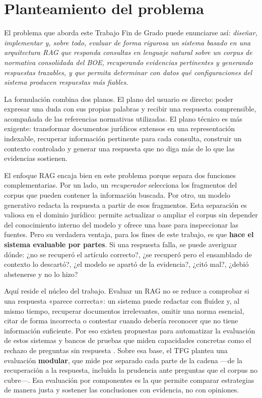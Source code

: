 \section{Planteamiento del problema}

\label{sec:planteamiento-problema}
 
El problema que aborda este Trabajo Fin de Grado puede enunciarse así: \emph{diseñar, implementar y, sobre todo, evaluar de forma rigurosa un sistema basado en una arquitectura RAG que responda consultas en lenguaje natural sobre un corpus de normativa consolidada del BOE, recuperando evidencias pertinentes y generando respuestas trazables, y que permita determinar con datos qué configuraciones del sistema producen respuestas más fiables}.
 
La formulación combina dos planos. El plano del usuario es directo: poder expresar una duda con sus propias palabras y recibir una respuesta comprensible, acompañada de las referencias normativas utilizadas. El plano técnico es más exigente: transformar documentos jurídicos extensos en una representación indexable, recuperar información pertinente para cada consulta, construir un contexto controlado y generar una respuesta que no diga más de lo que las evidencias sostienen.
 
El enfoque RAG encaja bien en este problema porque separa dos funciones complementarias. Por un lado, un \emph{recuperador} selecciona los fragmentos del corpus que pueden contener la información buscada. Por otro, un modelo generativo redacta la respuesta a partir de esos fragmentos. Esta separación es valiosa en el dominio jurídico: permite actualizar o ampliar el corpus sin depender del conocimiento interno del modelo y ofrece una base para inspeccionar las fuentes. Pero su verdadera ventaja, para los fines de este trabajo, es que \textbf{hace el sistema evaluable por partes}. Si una respuesta falla, se puede averiguar dónde: ¿no se recuperó el artículo correcto?, ¿se recuperó pero el ensamblado de contexto lo descartó?, ¿el modelo se apartó de la evidencia?, ¿citó mal?, ¿debió abstenerse y no lo hizo?
 
Aquí reside el núcleo del trabajo. Evaluar un RAG no se reduce a comprobar si una respuesta «parece correcta»: un sistema puede redactar con fluidez y, al mismo tiempo, recuperar documentos irrelevantes, omitir una norma esencial, citar de forma incorrecta o contestar cuando debería reconocer que no tiene información suficiente. Por eso existen propuestas para automatizar la evaluación de estos sistemas y bancos de pruebas que miden capacidades concretas como el rechazo de preguntas sin respuesta \cite{es2024ragas,saadfalcon2024ares,chen2024rgb}. Sobre esa base, el TFG plantea una evaluación \textbf{modular}, que mide por separado cada parte de la cadena —de la recuperación a la respuesta, incluida la prudencia ante preguntas que el corpus no cubre—. Esa evaluación por componentes es la que permite comparar estrategias de manera justa y sostener las conclusiones con evidencia, no con opiniones.

